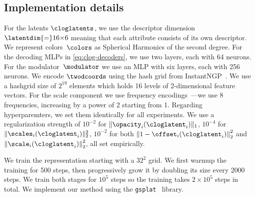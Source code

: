   \subsection{Implementation details}
    For the latents $\cloglatents$, we use the descriptor dimension
    $\latentdim{=}16{\times}6$ meaning that each attribute consists of its own
    descriptor.
    We represent colors~$\colors$ as Spherical Harmonics of the second degree.
    For the decoding MLPs in \cref{eq:clog-decoders}, we use two layers, each with
    64 neurons.
    For the modulator~$\modulator$ we use an MLP with six layers, each with 256
    neurons.
    We encode $\twodcoords$ using the hash grid from
    InstantNGP~\cite{mueller2022instant}.
    We use a hashgrid size of $2^{19}$ elements which holds 16 levels of
    2-dimensional feature vectors.
    For the scale component we use frequency
    encodings~\cite{mildenhall2020nerf}---we use 8 frequencies, increasing by a
    power of 2 starting from 1.
    Regarding hyperparemters, we set them identically for all experiments.
    We use a regularization strength of $10^{-2}$ for
    $\|\opacity_i(\cloglatent_i)\|_1$, $10^{-4}$ for
    $\|\scales_i(\cloglatent_i)\|_2^2$, $10^{-2}$ for both $\left\|1 -
      \offset_i(\cloglatent_i)\right\|_2^2$ and
    $\left\|\scale_i(\cloglatent_i)\right\|_2^2$, all set empirically.

    We train the representation starting with a $32^2$ grid.
    We first warmup the training for 500 steps, then progressively grow it by
    doubling its size every 2000 steps.
    We train both stages for $10^5$ steps so the training takes $2 \times 10^5$
    steps in total.
    We implement our method using the
    \texttt{gsplat}~\cite{ye2024gsplatopensourcelibrarygaussian} library.

